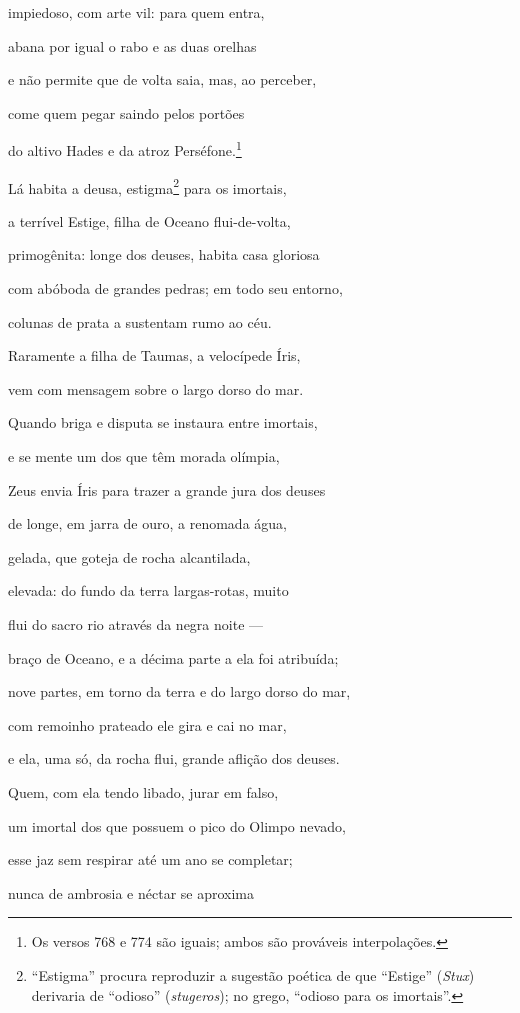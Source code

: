 \begin{pages}
\begin{Rightside}
impiedoso, com arte vil: para quem entra, 

abana por igual o rabo e as duas orelhas

e não permite que de volta saia, mas, ao perceber,

come quem pegar saindo pelos portões

do altivo Hades e da atroz Perséfone.\footnote{Os versos 768 e 774 são iguais; ambos são prováveis interpolações.}

\quad{}Lá habita a deusa, estigma\footnote{``Estigma'' procura reproduzir a sugestão poética de que
``Estige'' (\emph{Stux}) derivaria de ``odioso'' (\emph{stugeros}); no
grego, ``odioso para os imortais''.} para os imortais, 

a terrível Estige, filha de Oceano flui-de-volta,

primogênita: longe dos deuses, habita casa gloriosa

com abóboda de grandes pedras; em todo seu entorno,

colunas de prata a sustentam rumo ao céu.

Raramente a filha de Taumas, a velocípede Íris, 

vem com mensagem sobre o largo dorso do mar.

Quando briga e disputa se instaura entre imortais,

e se mente um dos que têm morada olímpia,

Zeus envia Íris para trazer a grande jura dos deuses

de longe, em jarra de ouro, a renomada água, 

gelada, que goteja de rocha alcantilada,

elevada: do fundo da terra largas-rotas, muito

flui do sacro rio através da negra noite ---

braço de Oceano, e a décima parte a ela foi atribuída;

nove partes, em torno da terra e do largo dorso do mar, 

com remoinho prateado ele gira e cai no mar,

e ela, uma só, da rocha flui, grande aflição dos deuses.

Quem, com ela tendo libado, jurar em falso,

um imortal dos que possuem o pico do Olimpo nevado,

esse jaz sem respirar até um ano se completar; 

nunca de ambrosia e néctar se aproxima


\end{Rightside}
\end{pages}
